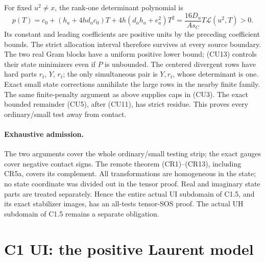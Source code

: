 For fixed $u^2\ne x$, the rank-one determinant polynomial is
\[
 p(T)=c_0+(h_a+4hd_ac_0)T+4h(d_ah_a+e_a^2)T^2
      =\frac{16D_u}{As_C}T\mathcal L(u^2,T)>0.
\]
Its constant and leading coefficients are positive units by the
preceding coefficient bounds. The strict allocation interval
therefore survives at every source boundary. The two real Gram
blocks have a uniform positive lower bound; (CU13) controls their
state minimizers even if $P$ is unbounded. The centered divergent
rows have hard parts $r_t$, $Y$, $r_t$; the only simultaneous pair
is $Y,r_t$, whose determinant is one. Exact small state corrections
annihilate the large rows in the nearby finite family. The same
finite-penalty argument as above supplies caps in (CU3). The exact
bounded remainder (CU5), after (CU11), has strict residue.
This proves every ordinary/small test away from contact.

\paragraph{Exhaustive admission.}
The two arguments cover the whole ordinary/small testing strip;
the exact gauges cover negative contact signs. The remote theorem
(CR1)--(CR13), including CR5a, covers its complement.
All transformations are homogeneous in the state; no state coordinate
was divided out in the tensor proof. Real and imaginary state parts
are treated separately. Hence the entire actual UI subdomain of C1.5,
and its exact stabilizer images, has an all-tests tensor-SOS proof.
The actual UH subdomain of C1.5 remains a separate obligation.


\section{\texorpdfstring{C1 UI: the positive Laurent model}{C1 UI: the positive Laurent model}}
\label{component:p050c7ae6d9b8}

\label{p050c7ae6d9b8:sec:c1-ui-leading}

